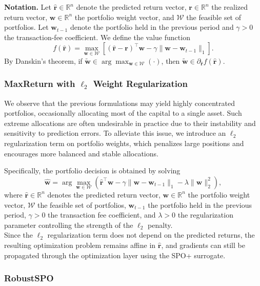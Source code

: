 \documentclass[review]{elsarticle}
\begin{document}
\noindent\textbf{Notation.}
Let $\hat{\bm r}\in\mathbb{R}^n$ denote the predicted return vector,
$\bm r\in\mathbb{R}^n$ the realized return vector,
$\bm w\in\mathbb{R}^n$ the portfolio weight vector,
and $\mathcal W$ the feasible set of portfolios.
Let $\bm w_{t-1}$ denote the portfolio held in the previous period and
$\gamma>0$ the transaction-fee coefficient.
We define the value function
\[
f(\hat{\bm r}) = \max_{\bm w\in\mathcal W}
\left[(\hat{\bm r}-\bm r)^\top \bm w
- \gamma \|\bm w-\bm w_{t-1}\|_1 \right].
\]
By Danskin's theorem, if
$\tilde{\bm w}\in\arg\max_{\bm w\in\mathcal W}(\cdot)$,
then $\tilde{\bm w}\in\partial_{\hat{\bm r}} f(\hat{\bm r})$.


\subsubsection{MaxReturn with $\ell_2$ Weight Regularization}

We observe that the previous formulations may yield highly concentrated portfolios, occasionally allocating most of the capital to a single asset. Such extreme allocations are often undesirable in practice due to their instability and sensitivity to prediction errors. To alleviate this issue, we introduce an $\ell_2$ regularization term on portfolio weights, which penalizes large positions and encourages more balanced and stable allocations.

Specifically, the portfolio decision is obtained by solving
\begin{equation}
\label{eq:maxreturn_l2_reg}
\hat{\bm w}
=
\arg\max_{\bm w\in\mathcal W}
\left(
\hat{\bm r}^\top \bm w
-
\gamma \|\bm w-\bm w_{t-1}\|_1
-
\lambda \|\bm w\|_2^2
\right),
\end{equation}
where $\hat{\bm r}\in\mathbb{R}^n$ denotes the predicted return vector,
$\bm w\in\mathbb{R}^n$ the portfolio weight vector,
$\mathcal W$ the feasible set of portfolios,
$\bm w_{t-1}$ the portfolio held in the previous period,
$\gamma>0$ the transaction fee coefficient, and
$\lambda>0$ the regularization parameter controlling the strength of the $\ell_2$ penalty.\\
Since the $\ell_2$ regularization term does not depend on the predicted returns, the resulting optimization problem remains affine in $\hat{\bm r}$, and gradients can still be propagated through the optimization layer using the SPO+ surrogate.

\subsubsection{RobustSPO}
\end{document}
